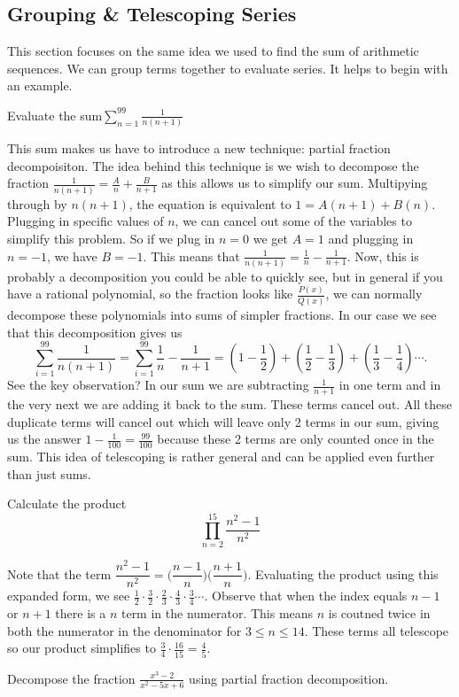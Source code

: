 \documentclass[11pt]{article}
\begin{document}
\subsection{Grouping \& Telescoping Series}
This section focuses on the same idea we used to find the sum of arithmetic sequences. We can group terms together to evaluate series. It helps to begin with an example. 
\begin{example}
Evaluate the sum$ \displaystyle \sum_{n=1}^{99} \frac{1}{n(n+1)}$
\end{example}
This sum makes us have to introduce a new technique: partial fraction decompoisiton. The idea behind this technique is we wish to decompose the fraction $\frac{1}{n(n+1)} = \frac{A}{n} + \frac{B}{n+1}$ as this allows us to simplify our sum. Multipying through by $n(n+1)$, the equation is equivalent to $1 = A(n+1) + B(n)$. Plugging in specific values of $n$, we can cancel out some of the variables to simplify this problem. So if we plug in $n=0$ we get $A=1$ and plugging in $n=-1$, we have $B=-1$. This means that $\frac{1}{n(n+1)} = \frac{1}{n} - \frac{1}{n+1}$. Now, this is probably a decomposition you could be able to quickly see,
but in general if you have a rational polynomial, so the fraction looks like $\frac{P(x)}{Q(x)}$, we can normally decompose these polynomials into sums of simpler fractions. In our case we see that this decomposition gives us
\[
\sum_{i=1}^{99} \frac{1}{n(n+1)} = \sum_{i=1}^{99} \frac{1}{n} - \frac{1}{n+1} = (1 - \frac{1}{2}) + (\frac{1}{2} - \frac{1}{3}) + (\frac{1}{3} - \frac{1}{4}) \cdots .
\]
See the key observation? In our sum we are subtracting $\frac{1}{n+1}$ in one term and in the very next we are adding it back to the sum. These terms cancel out. All these duplicate terms will cancel out which will leave only 2 terms in our sum, giving us the answer $1 - \frac{1}{100} = \frac{99}{100}$ because these 2 terms are only counted once in the sum. This idea of telescoping is rather general and can be applied even further than just sums.
\begin{example}
Calculate the product
\[
 \prod_{n=2}^{15} \frac{n^2-1}{n^2}
\]
\end{example}
Note that the term $\dfrac{n^2-1}{n^2} = \bigg( \dfrac{n-1}{n} \bigg) \bigg ( \dfrac{n+1}{n} \bigg)$. Evaluating the product using this expanded form, we see $\frac{1}{2} \cdot \frac{3}{2} \cdot \frac{2}{3} \cdot \frac{4}{3} \cdot \frac{3}{4} \cdots $. Observe that when the index equals $n-1$ or $n+1$ there is a $n$ term in the numerator. This means $n$ is coutned twice in both the numerator in the denominator for $3 \leq n \leq 14$. These terms all telescope so our product simplifies to $\frac{3}{4} \cdot \frac{16}{15} = \frac{4}{5}$.
\begin{exercise}
Decompose the fraction $\frac{x^3-2}{x^2-5x+6}$ using partial fraction decomposition.
\end{exercise}
\end{document}
